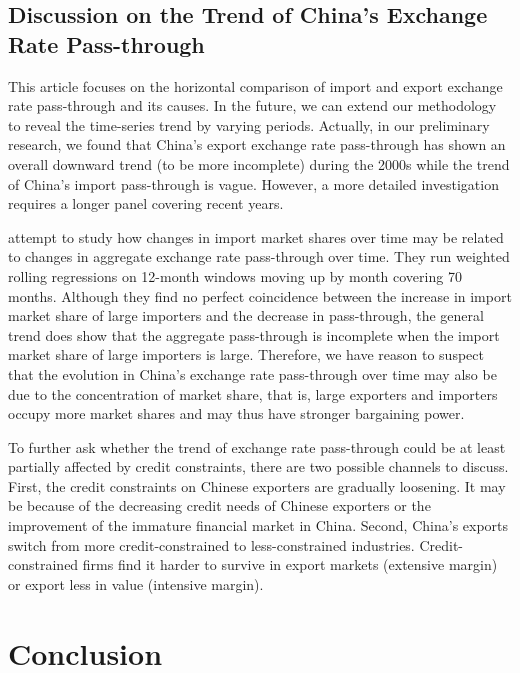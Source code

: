 \documentclass[12pt]{article}
\begin{document}
\subsection{Discussion on the Trend of China’s Exchange Rate Pass-through}

This article focuses on the horizontal comparison of import and export exchange rate pass-through and its causes. In the future, we can extend our methodology to reveal the time-series trend by varying periods. Actually, in our preliminary research, we found that China's export exchange rate pass-through has shown an overall downward trend (to be more incomplete) during the 2000s while the trend of China's import pass-through is vague. However, a more detailed investigation requires a longer panel covering recent years.

\cite{devereux2017} attempt to study how changes in import market shares over time may be related to changes in aggregate exchange rate pass-through over time. They run weighted rolling regressions on 12-month windows moving up by month covering 70 months. Although they find no perfect coincidence between the increase in import market share of large importers and the decrease in pass-through, the general trend does show that the aggregate pass-through is incomplete when the import market share of large importers is large. Therefore, we have reason to suspect that the evolution in China's exchange rate pass-through over time may also be due to the concentration of market share, that is, large exporters and importers occupy more market shares and may thus have stronger bargaining power.

To further ask whether the trend of exchange rate pass-through could be at least partially affected by credit constraints, there are two possible channels to discuss. First, the credit constraints on Chinese exporters are gradually loosening. It may be because of the decreasing credit needs of Chinese exporters or the improvement of the immature financial market in China. Second, China's exports switch from more credit-constrained to less-constrained industries. Credit-constrained firms find it harder to survive in export markets (extensive margin) or export less in value (intensive margin).

\section{Conclusion}\label{Conclusion}
\end{document}
